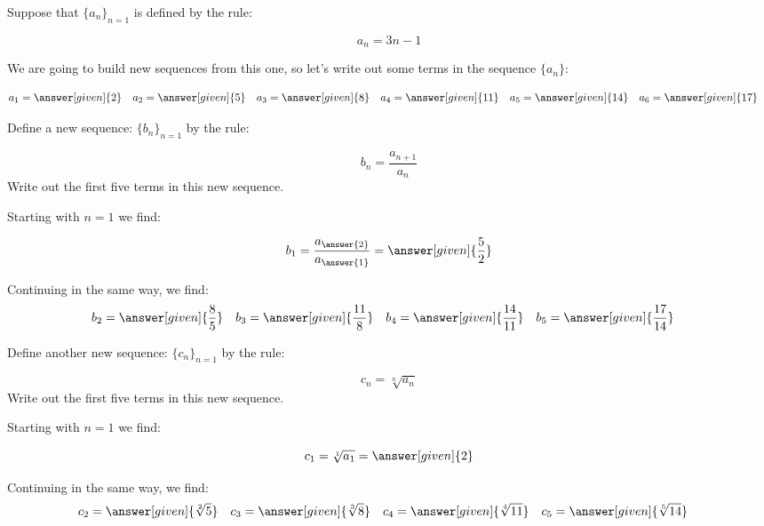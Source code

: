\documentclass{ximera}
\begin{document}
\begin{example}
Suppose that $\{a_n\}_{n=1}$ is defined by the rule:

\[
a_n = 3n-1
\]

We are going to build new sequences from this one, so let's write out some terms in the sequence $\{a_n\}$:

    \begin{align*}
      a_1 &= \answer[given]{2} & 
      a_2 &= \answer[given]{5} & 
      a_3 &= \answer[given]{8} & 
      a_4 &= \answer[given]{11} & 
      a_5 &= \answer[given]{14}  & 
      a_6 &= \answer[given]{17} 
    \end{align*}

\begin{example}
Define a new sequence: $\{b_n\}_{n=1}$ by the rule:

\[
b_n = \frac{a_{n+1}}{a_n} 
\]
Write out the first five terms in this new sequence.

\begin{explanation}
Starting with $n=1$ we find:

\[      b_1 = \frac{a_{\answer{2}}}{a_{\answer{1}}} = \answer[given]{\frac{5}{2}}       \]
      
Continuing in the same way, we find:     
     \begin{align*}
      	b_2 &=  \answer[given]{\frac{8}{5}}  & 
	b_3 &= \answer[given]{\frac{11}{8}}  & 
	b_4 &= \answer[given]{\frac{14}{11}}  & 
	b_5 &=  \answer[given]{\frac{17}{14}}  & 
    \end{align*}
    
\end{explanation}
    
\end{example}

\begin{example}
Define another new sequence: $\{c_n\}_{n=1}$ by the rule:

\[
c_n = \sqrt[n]{a_n} 
\]
Write out the first five terms in this new sequence.

\begin{explanation}
Starting with $n=1$ we find:

\[      c_1 = \sqrt[1]{a_1} = \answer[given]{2}       \]
      
Continuing in the same way, we find:     
     \begin{align*}
      	c_2 &=  \answer[given]{\sqrt[2]{5}}  & 
	c_3 &= \answer[given]{\sqrt[3]{8}}   & 
	c_4 &= \answer[given]{\sqrt[4]{11}}   & 
	c_5 &=  \answer[given]{\sqrt[5]{14}}   & 
    \end{align*}
    

\end{explanation}
\end{example}
\end{example}
\end{document}
